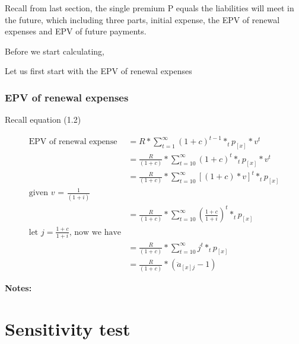\documentclass{report}
\begin{document}
Recall from last section, the single premium P equals the liabilities will meet in the future, which including three parts, initial expense, the EPV of renewal expenses and EPV of future payments.


Before we start calculating, 


Let us first start with the EPV of renewal expenses
\subsubsection{EPV of renewal expenses}

Recall equation (1.2)

\begin{align}
        \text{EPV of renewal expense}&= R  * \sum_{t=1}^{\infty}(1 + c )^{t-1} * _tp_{[x]}* v^t\\
        &= \frac{R}{(1+c)} * \sum_{t=10}^{\infty} (1 + c )^t * _tp_{[x]} * v^t\\
        &= \frac{R}{(1+c)} * \sum_{t=10}^{\infty} [(1 + c )*v]^t * _tp_{[x]} \\
\text{given $v$ = $\frac{1}{(1+i)} $}\\
        &= \frac{R}{(1+c)} * \sum_{t=10}^{\infty} \left(\frac{1+c}{1+i}\right)^t * _tp_{[x]} \\
\text{let $j = \frac{1+c}{1+i}$, now we have}\\
        &= \frac{R}{(1+c)} * \sum_{t=10}^{\infty} j^t * _tp_{[x]}\\
        &= \frac{R}{(1+c)} * (\ddot{a}_{[x]j}-1)
\end{align}

\textbf{Notes:}















\section{Sensitivity test}
 
\end{document}

